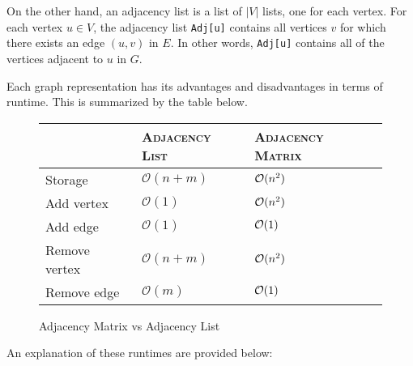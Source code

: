 On the other hand, an adjacency list is a list of $|V|$ lists, one for each vertex. For each vertex $u \in V$, the adjacency list \verb!Adj[u]! contains all vertices $v$ for which there exists an edge $(u, v)$ in $E$. In other words, \verb!Adj[u]! contains all of the vertices adjacent to $u$ in $G$.  


Each graph representation has its advantages and disadvantages in terms of runtime. This is summarized by the table below.

\begin{figure}[h]
\centering
\begin{tabular}{ | m{2cm} | m{4cm}| m{4cm} | } 
\hline
 & \textsc{Adjacency List} & \textsc{Adjacency Matrix} \\ 
\hline
Storage  & $\mathcal{O}(n + m)$ & $\mathcal{O}(n^2)$ \\ 
\hline
Add vertex & $\mathcal{O}(1)$ & $\mathcal{O}(n^2)$ \\ 
\hline
Add edge & $\mathcal{O}(1)$ & $\mathcal{O}(1)$ \\ 
\hline
Remove vertex & $\mathcal{O}(n + m)$ & $\mathcal{O}(n^2)$ \\ 
\hline
Remove edge & $\mathcal{O}(m)$ & $\mathcal{O}(1)$ \\ 
\hline
\end{tabular}
\caption{Adjacency Matrix vs Adjacency List}
\end{figure}

An explanation of these runtimes are provided below:

